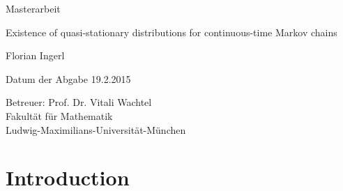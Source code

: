 \documentclass[12pt,a4paper]{scrartcl}
\numberwithin{equation}{section}
\begin{document}
  \pagestyle{empty}

  \begin{titlepage}

    \vspace*{2cm} 

 \begin{center} \large 
    
    Masterarbeit
    \vspace*{2cm}

    {\huge Existence of quasi-stationary distributions for continuous-time Markov chains}
    \vspace*{2.5cm}

    Florian Ingerl
    \vspace*{1.5cm}

    Datum der Abgabe
		19.2.2015
    \vspace*{4.5cm}


    Betreuer: Prof. Dr. Vitali Wachtel \\[1cm]
    Fakultät für Mathematik \\[1cm]
		Ludwig-Maximilians-Universität-München
  \end{center}
\end{titlepage}


\nocite{*}
  \tableofcontents

\newpage
 


  \pagestyle{headings}


\section{Introduction}
\end{document}
